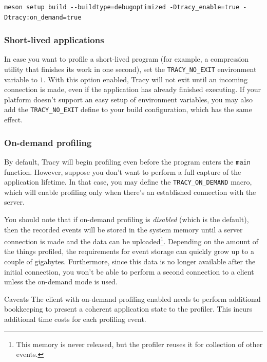 \documentclass[hidelinks,titlepage,a4paper,twoside]{article}
\begin{document}
\begin{lstlisting}
meson setup build --buildtype=debugoptimized -Dtracy_enable=true -Dtracy:on_demand=true
\end{lstlisting}

\subsubsection{Short-lived applications}

In case you want to profile a short-lived program (for example, a compression utility that finishes its work in one second), set the \texttt{TRACY\_NO\_EXIT} environment variable to $1$. With this option enabled, Tracy will not exit until an incoming connection is made, even if the application has already finished executing. If your platform doesn't support an easy setup of environment variables, you may also add the \texttt{TRACY\_NO\_EXIT} define to your build configuration, which has the same effect.

\subsubsection{On-demand profiling}
\label{ondemand}

By default, Tracy will begin profiling even before the program enters the \texttt{main} function. However, suppose you don't want to perform a full capture of the application lifetime. In that case, you may define the \texttt{TRACY\_ON\_DEMAND} macro, which will enable profiling only when there's an established connection with the server.

You should note that if on-demand profiling is \emph{disabled} (which is the default), then the recorded events will be stored in the system memory until a server connection is made and the data can be uploaded\footnote{This memory is never released, but the profiler reuses it for collection of other events.}. Depending on the amount of the things profiled, the requirements for event storage can quickly grow up to a couple of gigabytes. Furthermore, since this data is no longer available after the initial connection, you won't be able to perform a second connection to a client unless the on-demand mode is used.

\begin{bclogo}[
noborder=true,
couleur=black!5,
logo=\bcattention
]{Caveats}
The client with on-demand profiling enabled needs to perform additional bookkeeping to present a coherent application state to the profiler. This incurs additional time costs for each profiling event.
\end{bclogo}
\end{document}
